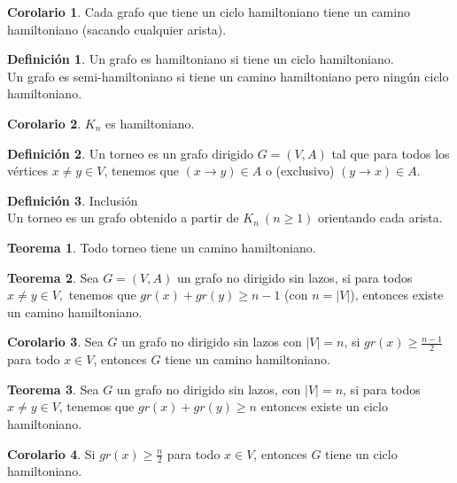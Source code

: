 \documentclass[10pt]{article}
\theoremstyle{definition}
\newtheorem{definition}{Definición}[section]
\newtheorem{theorem}{Teorema}[section]
\newtheorem{corollary}{Corolario}[theorem]
\begin{document}
\begin{corollary}
	Cada grafo que tiene un ciclo hamiltoniano tiene un camino hamiltoniano (sacando cualquier arista).
\end{corollary}
\begin{definition}
	Un grafo es hamiltoniano si tiene un ciclo hamiltoniano.\\
	Un grafo es semi-hamiltoniano si tiene un camino hamiltoniano pero ningún ciclo hamiltoniano.
\end{definition}
\begin{corollary}
	$K_n$ es hamiltoniano.
\end{corollary}
\begin{definition}
	Un torneo es un grafo dirigido $G=(V,A)$ tal que para todos los vértices $x\neq y\in V$, tenemos que $(x\to y)\in A$ o (exclusivo) $(y\to x)\in A$.
\end{definition}
\begin{definition}{Inclusión}
	\\Un torneo es un grafo obtenido a partir de $K_n\ (n\ge1)$ orientando cada arista.
\end{definition}
\begin{theorem}
	Todo torneo tiene un camino hamiltoniano.
\end{theorem}
\begin{theorem}
	Sea $G=(V,A)$ un grafo no dirigido sin lazos, si para todos $x\neq y\in V,$ tenemos que $gr(x)+gr(y)\ge n-1$ (con $n=|V|$), entonces existe un camino hamiltoniano.
\end{theorem}
\begin{corollary}
	Sea $G$ un grafo no dirigido sin lazos con $|V|=n$, si $gr(x)\ge \frac{n-1}{2}$ para todo $x\in V$, entonces $G$ tiene un camino hamiltoniano.
\end{corollary}
\begin{theorem}
	Sea $G$ un grafo no dirigido sin lazos, con $|V|=n$, si para todos $x\neq y\in V$, tenemos que $gr(x)+gr(y)\ge n$ entonces existe un ciclo hamiltoniano.
\end{theorem}
\begin{corollary}
	Si $gr(x)\ge \frac{n}{2}$ para todo $x\in V$, entonces $G$ tiene un ciclo hamiltoniano.
\end{corollary}
\end{document}

